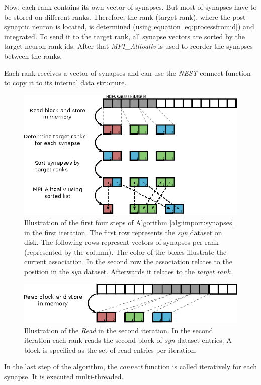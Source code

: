 Now, each rank contains its own vector of synapses.
But most of synapses have to be stored on different ranks.
Therefore, the rank (target rank), where the post-synaptic neuron is located, is determined (using equation \ref{eq:processfromid})
and integrated.
To send it to the target rank, all synapse vectors are sorted by the target neuron rank ids.
After that \emph{MPI\_Alltoallv} is used to reorder the synapses between the ranks.

Each rank receives a vector of synapses and can use the \emph{NEST} connect function to copy it to its internal data structure.
\begin{figure}[ht!]
\centering
\includegraphics[scale=2.0]{pictures/import_syn_vis.eps}
\caption[Illustration of the first four steps of Algorithm \ref{alg:import:synapses} in the first iteration]{Illustration of the first four steps of Algorithm \ref{alg:import:synapses} in the first iteration.
The first row represents the \emph{syn} dataset on disk.
The following rows represent vectors of synapses per rank (represented by the column).
The color of the boxes illustrate the current association.
In the second row the association relates to the position in the \emph{syn} dataset.
Afterwards it relates to the \emph{target rank}.
}
\label{fig:importsynvis}
\end{figure}

\begin{figure}[ht!]
\centering
\includegraphics[scale=2.0]{pictures/import_syn_vis_second_it.eps}
\caption[Illustration of the \emph{Read} in the second iteration]{Illustration of the \emph{Read} in the second iteration.
In the second iteration each rank reads the second block of \emph{syn} dataset entries.
A block is specified as the set of read entries per iteration.}
\label{fig:importsynvis2nd}
\end{figure}
\newpage
In the last step of the algorithm, the \emph{connect} function is called iteratively for each synapse.
It is executed multi-threaded.

